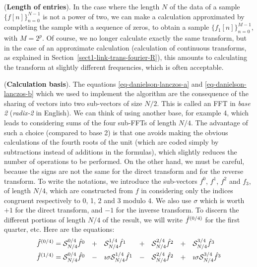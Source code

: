 \begin{rem}{(\upshape \textbf{Length of entries}).} 
In the case where the length $N$ of the data of a sample $ \{f[n]\}_{n = 0}^{N-1} $ is not a power of two, we can make a calculation approximated by completing the sample with a sequence of zeros, to obtain a sample $ \{f_1 [n]\}_{n = 0}^{M-1} $, with $ M = 2^p $. Of course, we no longer calculate exactly the same transform, but in the case of an approximate calculation (calculation of continuous transforms, as explained in Section~\ref{sect1-link-trans-fourier-R}), this amounts to calculating the transform at slightly different frequencies, which is often acceptable.
\end{rem}
 
 
\begin{rem}{(\upshape \textbf{Calculation basis}).} 
\label{rmk-radix-fft}
 The equations \eqref{eq-danielson-lanczos-a} and \eqref{eq-danielson-lanczos-b} which we used to implement the algorithm are the consequence of the sharing of vectors into two sub-vectors of size $ N / 2 $. This is called an FFT in \textit{base 2} (\textit{radix-2} in English). We can think of using another base, for example 4, which leads to considering sums of the four sub-FFTs of length $ N / 4 $. The advantage of such a choice (compared to base 2) is that one avoids making the obvious calculations of the fourth roots of the unit (which are coded simply by subtractions instead of additions in the formulas), which slightly reduces the number of operations to be performed. On the other hand, we must be careful, because the signs are not the same for the direct transform and for the reverse transform. To write the notations, we introduce the sub-vectors $ f^0 $, $ f^1 $, $ f^2 $ and $ f_3 $, of length $ N / 4 $, which are constructed from $ f $ in considering only the indices congruent respectively to 0, 1, 2 and 3 modulo 4. We also use $ \sigma $ which is worth $ + 1 $ for the direct transform, and $ -1 $ for the inverse transform. To discern the different portions of length $ N / 4 $ of the result, we will write $ \hat{f}^{(0/4)} $ for the first quarter, etc. Here are the equations:
\begin{align*}
\wh{f}^{(0/4)} & = \Ss_{N / 4}^{0/4} \wh{f^0} & + & \quad \Ss_{N / 4}^{1 / 4} \wh{f^1} & + & \quad \Ss_{N / 4}^{2/4} \wh{f^2} & + & \quad \Ss_{N / 4}^{3 / 4} \wh{f^3} \\
\wh{f}^{(1/4)} & = \Ss_{N / 4}^{0/4} \wh{f^0} & - & \quad \imath \sigma \Ss_{N / 4 }^{1/4} \wh{f^1} & - & \quad \Ss_{N / 4}^{2/4} \wh{f^2} & + & \quad \imath \sigma \Ss_{N / 4}^{3/4} \wh{f^3} \\

\end{align*}
\end{rem}
